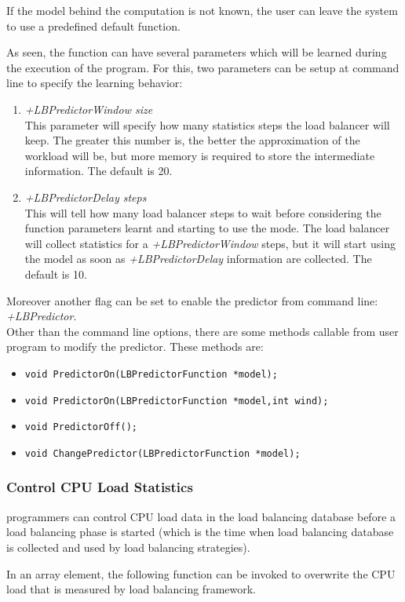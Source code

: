 If the model behind the computation is not known, the user can leave the system to
use a predefined default function.

As seen, the function can have several parameters which will be learned during
the execution of the program. For this, two parameters can be setup at command
line to specify the learning behavior:
\begin{enumerate}
\item {\em +LBPredictorWindow size}\\
This parameter will specify how many statistics steps the load balancer will keep. 
The greater this number is, the better the
approximation of the workload will be, but more memory is required to store
the intermediate information. The default is 20.
\item {\em +LBPredictorDelay steps}\\
This will tell how many load balancer steps to wait before considering the
function parameters learnt and starting to use the mode. The load balancer will
collect statistics for a {\em +LBPredictorWindow} steps, but it will start using
the model as soon as {\em +LBPredictorDelay} information are collected. The
default is 10.
\end{enumerate}
Moreover another flag can be set to enable the predictor from command line: {\em
+LBPredictor}.\\
Other than the command line options, there are some methods
callable from user program to modify the predictor. These methods are:
\begin{itemize}
\item {\tt void PredictorOn(LBPredictorFunction *model);}
\item {\tt void PredictorOn(LBPredictorFunction *model,int wind);}
\item {\tt void PredictorOff();}
\item {\tt void ChangePredictor(LBPredictorFunction *model);}
\end{itemize}

\subsubsection{Control CPU Load Statistics}

\charmpp{} programmers can control CPU load data in the load balancing database
before a load balancing phase is started (which is the time when load balancing
database is collected and used by load balancing strategies).

In an array element, the following function can be invoked to overwrite the 
CPU load that is measured by load balancing framework.


